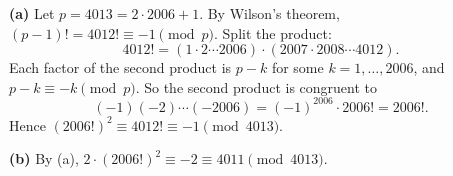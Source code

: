 \textbf{(a)} Let $p=4013=2\cdot2006+1$. By Wilson's theorem, $(p-1)!=4012!\equiv-1\pmod p$. Split the product:
\[4012!=\left(1\cdot2\cdots2006\right)\cdot\left(2007\cdot2008\cdots4012\right).\]
Each factor of the second product is $p-k$ for some $k=1,\ldots,2006$, and $p-k\equiv-k\pmod p$. So the second product is congruent to
\[(-1)(-2)\cdots(-2006)=(-1)^{2006}\cdot2006!=2006!.\]
Hence $(2006!)^2\equiv4012!\equiv-1\pmod{4013}$.

\textbf{(b)} By (a), $2\cdot(2006!)^2\equiv-2\equiv\boxed{4011}\pmod{4013}$.
